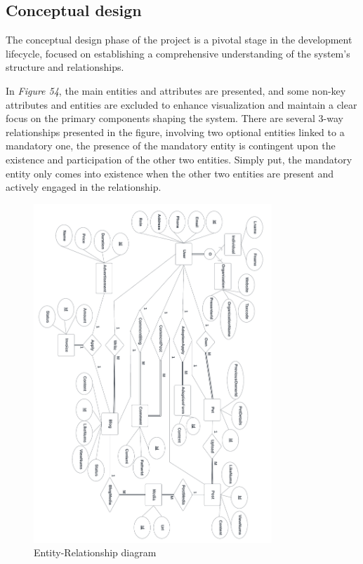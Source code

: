 \subsection{Conceptual design}

The conceptual design phase of the project is a pivotal stage in the development lifecycle, focused on establishing a comprehensive understanding of the system's structure and relationships.


In \emph{Figure 54}, the main entities and attributes are presented, and
some non-key attributes and entities are excluded to enhance
visualization and maintain a clear focus on the primary components
shaping the system. There are several 3-way relationships presented in
the figure, involving two optional entities linked to a mandatory one,
the presence of the mandatory entity is contingent upon the existence
and participation of the other two entities. Simply put, the mandatory
entity only comes into existence when the other two entities are present
and actively engaged in the relationship.

\begin{figure}[H]
    \centering
    \includegraphics[width=0.8\textwidth]{Figures/erd.png}
    \caption{Entity-Relationship diagram}
\end{figure}
\clearpage

